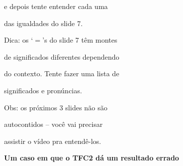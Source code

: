 \documentclass[oneside,12pt]{article}
\begin{document}
e depois tente entender cada uma

das igualdades do slide 7.

\bsk

Dica: os `$=$'s do slide 7 têm montes

de significados diferentes dependendo

do contexto. Tente fazer uma lista de

significados e pronúncias.


\bsk

Obs: os próximos 3 slides não são

autocontidos -- você vai precisar

assistir o vídeo pra entendê-los.








\newpage


%                     

{\bf Um caso em que o TFC2 dá um resultado errado}

\ssk

%
\end{document}
